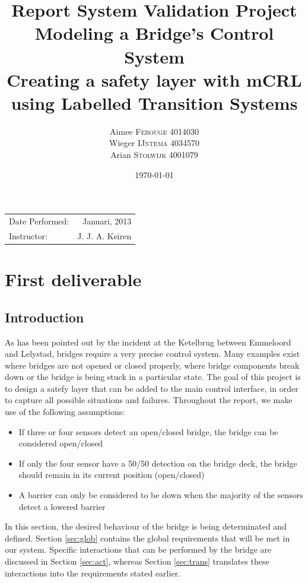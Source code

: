 \documentclass{article}
\title{Report System Validation Project \\ Modeling a Bridge's Control System\\ Creating a safety layer with mCRL using Labelled Transition Systems} %
\author{Aimee \textsc{Ferouge} 4014030 \\Wieger \textsc{IJntema} 4034570 \\Arian \textsc{Stolwijk} 4001079} %
\date{\today} %
\begin{document}
\maketitle %

\begin{center}
\begin{tabular}{l r}
Date Performed: & Januari, 2013 \\ %
Instructor: & J. J. A. Keiren %
\end{tabular}
\end{center}





\section{First deliverable}
\subsection{Introduction}

As has been pointed out by the incident at the Ketelbrug between Emmeloord and Lelystad, bridges require a very precise control system.  Many examples exist where bridges are not opened or closed properly, where bridge components break down or the bridge is being stuck in a particular state. The goal of this project is to design a satefy layer that can be added to the main control interface, in order to capture all possible situations and failures.
Throughout the report, we make use of the following assumptions:
%
\begin{itemize}
	\item If three or four sensors detect an open/closed bridge, the bridge can be considered open/closed
	\item If only the four sensor have a 50/50 detection on the bridge deck, the bridge should remain in its current position (open/closed)
	\item A barrier can only be considered to be down when the majority of the sensors detect a lowered barrier
\end{itemize}
%
In this section, the desired behaviour of the bridge is being determinated and defined. Section \ref{sec:glob} contains the global requirements that will be met in our system. Specific interactions that can be performed by the bridge are discussed in Section \ref{sec:act}, whereas Section \ref{sec:trans} translates these interactions into the requirements stated earlier.
\end{document}
